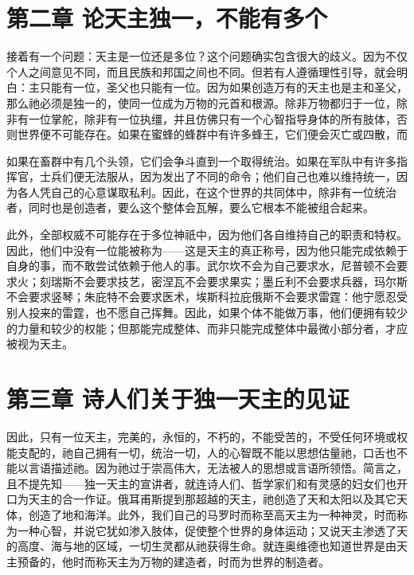 
\section{第二章 论天主独一，不能有多个}

接着有一个问题：天主是一位还是多位？这个问题确实包含很大的歧义。因为不仅个人之间意见不同，而且民族和邦国之间也不同。但若有人遵循理性引导，就会明白：主只能有一位，圣父也只能有一位。因为如果创造万有的天主也是主和圣父，那么祂必须是独一的，使同一位成为万物的元首和根源。除非万物都归于一位，除非有一位掌舵，除非有一位执缰，并且仿佛只有一个心智指导身体的所有肢体，否则世界便不可能存在。如果在蜜蜂的蜂群中有许多蜂王，它们便会灭亡或四散，而\par

\par

如果在畜群中有几个头领，它们会争斗直到一个取得统治。如果在军队中有许多指挥官，士兵们便无法服从，因为发出了不同的命令；他们自己也难以维持统一，因为各人凭自己的心意谋取私利。因此，在这个世界的共同体中，除非有一位统治者，同时也是创造者，要么这个整体会瓦解，要么它根本不能被组合起来。\par

此外，全部权威不可能存在于多位神祇中，因为他们各自维持自己的职责和特权。因此，他们中没有一位能被称为——这是天主的真正称号，因为他只能完成依赖于自身的事，而不敢尝试依赖于他人的事。武尔坎不会为自己要求水，尼普顿不会要求火；刻瑞斯不会要求技艺，密涅瓦不会要求果实；墨丘利不会要求兵器，玛尔斯不会要求竖琴；朱庇特不会要求医术，埃斯科拉庇俄斯不会要求雷霆：他宁愿忍受别人投来的雷霆，也不愿自己挥舞。因此，如果个体不能做万事，他们便拥有较少的力量和较少的权能；但那能完成整体、而非只能完成整体中最微小部分者，才应被视为天主。\par


\section{第三章 诗人们关于独一天主的见证}

因此，只有一位天主，完美的，永恒的，不朽的，不能受苦的，不受任何环境或权能支配的，祂自己拥有一切，统治一切，人的心智既不能以思想估量祂，口舌也不能以言语描述祂。因为祂过于崇高伟大，无法被人的思想或言语所领悟。简言之，且不提先知——独一天主的宣讲者，就连诗人们、哲学家们和有灵感的妇女们也开口为天主的合一作证。俄耳甫斯提到那超越的天主，祂创造了天和太阳以及其它天体，创造了地和海洋。此外，我们自己的马罗时而称至高天主为一种神灵，时而称为一种心智，并说它犹如渗入肢体，促使整个世界的身体运动；又说天主渗透了天的高度、海与地的区域，一切生灵都从祂获得生命。就连奥维德也知道世界是由天主预备的，他时而称天主为万物的建造者，时而为世界的制造者。\par


